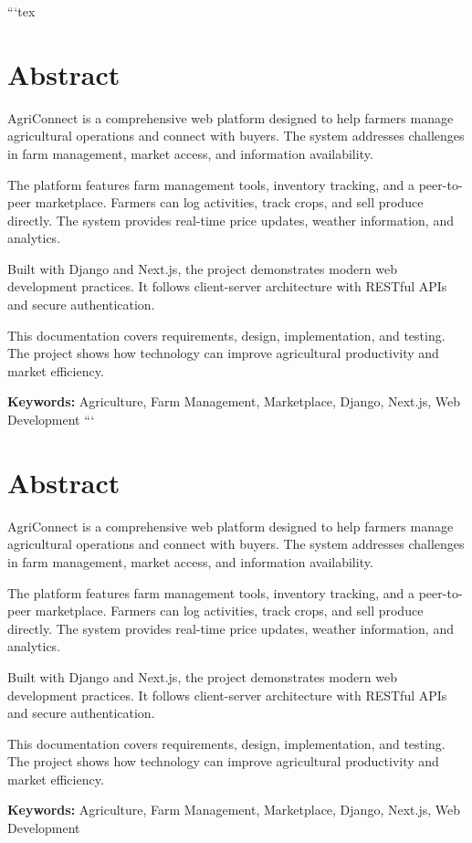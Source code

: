 ```tex
\section*{Abstract}

AgriConnect is a comprehensive web platform designed to help farmers manage agricultural operations and connect with buyers. The system addresses challenges in farm management, market access, and information availability.

The platform features farm management tools, inventory tracking, and a peer-to-peer marketplace. Farmers can log activities, track crops, and sell produce directly. The system provides real-time price updates, weather information, and analytics.

Built with Django and Next.js, the project demonstrates modern web development practices. It follows client-server architecture with RESTful APIs and secure authentication.

This documentation covers requirements, design, implementation, and testing. The project shows how technology can improve agricultural productivity and market efficiency.

\textbf{Keywords:} Agriculture, Farm Management, Marketplace, Django, Next.js, Web Development
```
\section*{Abstract}

AgriConnect is a comprehensive web platform designed to help farmers manage agricultural operations and connect with buyers. The system addresses challenges in farm management, market access, and information availability.

The platform features farm management tools, inventory tracking, and a peer-to-peer marketplace. Farmers can log activities, track crops, and sell produce directly. The system provides real-time price updates, weather information, and analytics.

Built with Django and Next.js, the project demonstrates modern web development practices. It follows client-server architecture with RESTful APIs and secure authentication.

This documentation covers requirements, design, implementation, and testing. The project shows how technology can improve agricultural productivity and market efficiency.

\textbf{Keywords:} Agriculture, Farm Management, Marketplace, Django, Next.js, Web Development